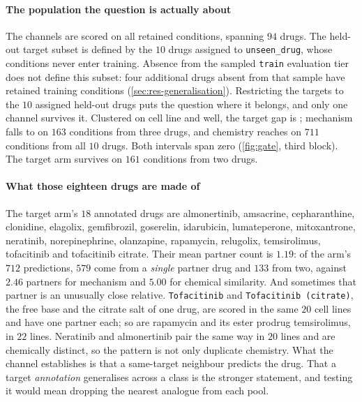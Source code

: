 \paragraph{The population the question is actually about} The channels are scored
on all retained conditions, spanning $94$ drugs. The held-out target subset is
defined by the $10$ drugs assigned to \texttt{unseen\_drug}, whose conditions
never enter training. Absence from the sampled \texttt{train} evaluation tier
does not define this subset: four additional drugs absent from that sample have
retained training conditions (\cref{sec:res-generalisation}). Restricting the
targets to the $10$ assigned held-out drugs
puts the question where it belongs, and only one channel survives it. Clustered
on cell line and well, the target gap is
; mechanism falls to
 on $163$ conditions from three drugs, and
chemistry reaches  on $711$ conditions from all
$10$ drugs. Both intervals span zero (\cref{fig:gate}, third block). The target
arm survives on $161$ conditions from two drugs.

\paragraph{What those eighteen drugs are made of} The target arm's $18$ annotated
drugs are almonertinib, amsacrine, cepharanthine, clonidine, elagolix,
gemfibrozil, goserelin, idarubicin, lumateperone, mitoxantrone, neratinib,
norepinephrine, olanzapine, rapamycin, relugolix, temsirolimus, tofacitinib and
tofacitinib citrate. Their mean partner count is $1.19$: of the arm's $712$
predictions, $579$ come from a \emph{single} partner drug and $133$ from two,
against $2.46$ partners for mechanism and $5.00$ for chemical similarity. And
sometimes that partner is an unusually close relative. \texttt{Tofacitinib} and
\texttt{Tofacitinib (citrate)}, the free base and the citrate salt of one drug,
are scored in the same $20$ cell lines and have one partner each; so are rapamycin
and its ester prodrug temsirolimus, in $22$ lines. Neratinib and almonertinib pair
the same way in $20$ lines and are chemically distinct, so the pattern is not only
duplicate chemistry. What the channel establishes is that a same-target neighbour
predicts the drug. That a target \emph{annotation} generalises across a class is
the stronger statement, and testing it would mean dropping the nearest analogue
from each pool.

